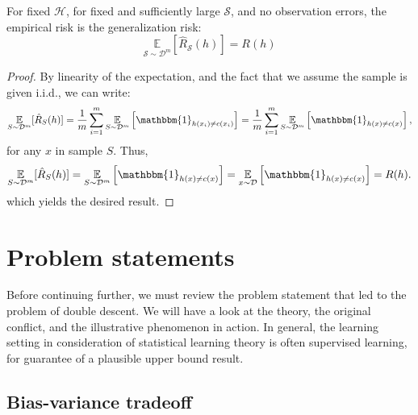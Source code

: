 \documentclass[10pt]{article} %
\begin{document}
\begin{theorem}[\cite{10.5555/2371238}]\label{thm:minimalNeu}
    For fixed $\mathcal{H}$, for fixed and sufficiently large $\mathcal{S}$, and no observation errors, the empirical risk is the generalization risk: \begin{equation}
        \underset{\mathcal{S}\sim \mathcal{D}^{m}}{\mathbb{E}}[\hat{R}_{\mathcal{S}}(h)]  = R(h)
    \end{equation} 
\end{theorem}
\begin{proof}
    By linearity of the expectation, and the fact that we assume the sample is given i.i.d., we can write: 
\[
\underset{S \sim \mathcal{D}^m}{\mathbb{E}}[\hat{R}_S(h)] 
= \frac{1}{m} \sum_{i=1}^m 
\underset{S \sim \mathcal{D}^m}{\mathbb{E}} 
\left[ \mathbbm{1}_{h(x_i) \ne c(x_i)} \right] 
= \frac{1}{m} \sum_{i=1}^m 
\underset{S \sim \mathcal{D}^m}{\mathbb{E}} 
\left[ \mathbbm{1}_{h(x) \ne c(x)} \right],
\]
for any \( x \) in sample \( S \). Thus,
\[
\underset{S \sim \mathcal{D}^m}{\mathbb{E}}[\hat{R}_S(h)] 
= \underset{S \sim \mathcal{D}^m}{\mathbb{E}} 
\left[ \mathbbm{1}_{h(x) \ne c(x)} \right] 
= \underset{x \sim \mathcal{D}}{\mathbb{E}} 
\left[ \mathbbm{1}_{h(x) \ne c(x)} \right] 
= R(h).
\]
which yields the desired result. 
\end{proof}
\section{Problem statements}

Before continuing further, we must review the problem statement that led to the problem of double descent. We will have a look at the theory, the original conflict, and the illustrative phenomenon in action. In general, the learning setting in consideration of statistical learning theory is often supervised learning, for guarantee of a plausible upper bound result. 

\subsection{Bias-variance tradeoff}
\end{document}
